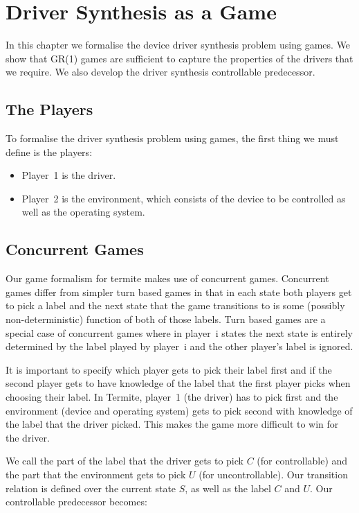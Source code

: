 \chapter{Driver Synthesis as a Game}

In this chapter we formalise the device driver synthesis problem using games. We show that GR(1) games are sufficient to capture the properties of the drivers that we require. We also develop the driver synthesis controllable predecessor.

\section{The Players}

To formalise the driver synthesis problem using games, the first thing we must define is the players:

\begin{itemize}
    \item Player~1 is the driver. 
    \item Player~2 is the environment, which consists of the device to be controlled as well as the operating system.
\end{itemize}


\section{Concurrent Games}
\label{sec:conc_games}

Our game formalism for termite makes use of concurrent games. Concurrent games differ from simpler turn based games in that in each state both players get to pick a label and the next state that the game transitions to is some (possibly non-deterministic) function of both of those labels. Turn based games are a special case of concurrent games where in player~i states the next state is entirely determined by the label played by player~i and the other player's label is ignored. 

It is important to specify which player gets to pick their label first and if the second player gets to have knowledge of the label that the first player picks when choosing their label. In Termite, player~1 (the driver) has to pick first and the environment (device and operating system) gets to pick second with knowledge of the label that the driver picked. This makes the game more difficult to win for the driver.

We call the part of the label that the driver gets to pick $C$ (for controllable) and the part that the environment gets to pick $U$ (for uncontrollable). Our transition relation is defined over the current state $S$, as well as the label $C$ and $U$. Our controllable predecessor becomes: 

